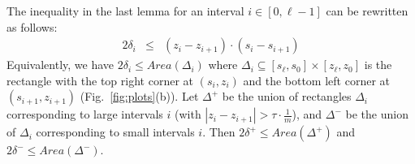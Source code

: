 \documentclass[final,12pt]{colt2018}
\begin{document}
The inequality in the last lemma for an interval $i\in[0,\ell-1]$ can be rewritten as follows:
\begin{eqnarray}
2\delta_i & \le &  (z_i-z_{i+1}) \cdot (s_{i} - s_{i+1}) %
\end{eqnarray}
Equivalently, we have  $2\delta_i\le Area(\Delta_i)$
where $\Delta_i\subseteq[s_\ell,s_0]\times[z_\ell,z_0]$ is the rectangle with the top right corner
at $(s_i,z_i)$ and the bottom left corner at $(s_{i+1},z_{i+1})$ (Fig.~\ref{fig:plots}(b)).
Let $\Delta^+$ be the union of rectangles $\Delta_i$ corresponding to large intervals $i$ (with $|z_i-z_{i+1}|>\tau\cdot\frac{1}{m}$),
and $\Delta^-$ be the union of $\Delta_i$ corresponding to small intervals $i$.
Then $2\delta^+\le Area(\Delta^+)$ and $2\delta^-\le Area(\Delta^-)$.
\end{document}
